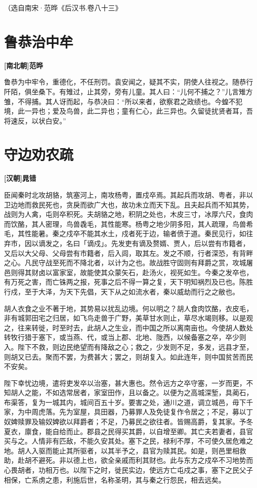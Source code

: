 \documentclass[UTF8,titlepage,oneside]{ctexbook}
\begin{document}
（选自南宋·范晔《后汉书.卷八十三》



\chapter*{鲁恭治中牟}
\begin{center}
	\textbf{[南北朝]范晔}
\end{center}


鲁恭为中牢令，重德化，不任刑罚。袁安闻之，疑其不实，阴使人往视之。随恭行阡陌，俱坐桑下。有雉过，止其旁，旁有儿童。其人曰：“儿何不捕之？”儿言雉方雏，不得捕。其人讶而起，与恭决曰：“所以来者，欲察君之政绩也。今蝗不犯境，此一异也；爱及鸟兽，此二异也；童有仁心，此三异也。久留徒扰贤者耳，吾将速反，以状白安。”

\chapter*{守边劝农疏}
\begin{center}
	\textbf{[汉朝]晁错}
\end{center}

臣闻秦时北攻胡貉，筑塞河上，南攻杨粤，置戍卒焉。其起兵而攻胡、粤者，非以卫边地而救民死也，贪戾而欲广大也，故功未立而天下乱。且夫起兵而不知其势，战则为人禽，屯则卒积死。夫胡貉之地，积阴之处也，木皮三寸，冰厚六尺，食肉而饮酪，其人密理，鸟兽毳毛，其性能寒。杨粤之地少阴多阳，其人疏理，鸟兽希毛，其性能暑。秦之戍卒不能其水土，戍者死于边，输者偾于道。秦民见行，如往弃市，因以谪发之，名曰「谪戍」。先发吏有谪及赘婿、贾人，后以尝有市籍者，又后以大父母、父母尝有市籍者，后入闾，取其左。发之不顺，行者深恐，有背畔之心。凡民守战至死而不降北者，以计为之也。故战胜守固则有拜爵之赏，攻城屠邑则得其财卤以富家室，故能使其众蒙矢石，赴汤火，视死如生。今秦之发卒也，有万死之害，而亡铢两之报，死事之后不得一算之复，天下明知祸烈及已也。陈胜行戍，至于大泽，为天下先倡，天下从之如流水者，秦以威劫而行之之敝也。

胡人衣食之业不著于地，其势易以扰乱边境。何以明之？胡人食肉饮酪，衣皮毛，非有城郭田宅之归居，如飞鸟走兽于广野，美草甘水则止，草尽水竭则移。以是观之，往来转徙，时至时去，此胡人之生业，而中国之所以离南亩也。今使胡人数处转牧行猎于塞下，或当燕、代，或当上郡、北地、陇西，以候备塞之卒，卒少则入。陛下不救，则边民绝望而有降敌之心；救之，少发则不足，多发，远县才至，则胡又已去。聚而不罢，为费甚大；罢之，则胡复入。如此连年，则中国贫苦而民不安矣。

陛下幸忧边境，遣将吏发卒以治塞，甚大惠也。然令远方之卒守塞，一岁而更，不知胡人之能，不如选常居者，家室田作，且以备之。以便为之高城深堑，具蔺石，布渠答，复为一城其内，城间百五十岁。要害之处，通川之道，调立城邑，毋下千家，为中周虎落。先为室屋，具田器，乃募罪人及免徒复作令居之；不足，募以丁奴婢赎罪及输奴婢欲以拜爵者；不足，乃募民之欲往者。皆赐高爵，复其家。予冬夏衣，廪食，能自给而止。郡县之民得买其爵，以自增至卿。其亡夫若妻者，县官买与之。人情非有匹敌，不能久安其处。塞下之民，禄利不厚，不可使久居危难之地。胡人入驱而能止其所驱者，以其半予之，县官为赎其民。如是，则邑里相救助，赴胡不避死。非以德上也，欲全亲戚而利其财也。此与东方之戍卒不习地势而心畏胡者，功相万也。以陛下之时，徙民实边，使远方亡屯戍之事，塞下之民父子相保，亡系虏之患，利施后世，名称圣明，其与秦之行怨民，相去远矣。
\end{document}
